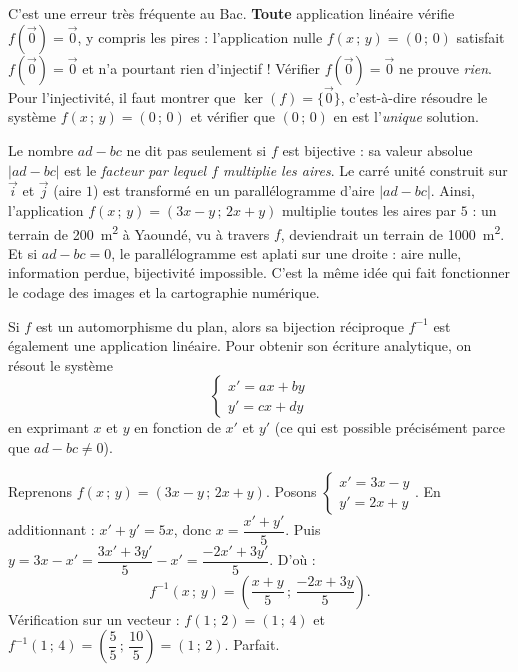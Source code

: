 \documentclass[11pt]{article}
\newcommand{\cle}[1]{{\popxbold\color{popdark}#1}}
\newcounter{popsec}
\newcounter{popsub}
\newcommand{\courssub}[1]{%
  \stepcounter{popsub}%
  \par\vspace{9pt}\noindent{\popxbold\fontsize{11.5}{13}\selectfont\color{popink}{\color{poporange}\thepopsec.\thepopsub}\hspace{6pt}#1}\par\nopagebreak\vspace{4pt}
}
\begin{document}
\begin{attention}[Le piège classique : « $f(\vec{0}) = \vec{0}$ donc $f$ est bijective »]
C'est une erreur très fréquente au Bac. \textbf{Toute} application linéaire vérifie $f(\vec{0}) = \vec{0}$, y compris les pires : l'application nulle $f(x\,;\,y) = (0\,;\,0)$ satisfait $f(\vec{0}) = \vec{0}$ et n'a pourtant rien d'injectif ! Vérifier $f(\vec{0}) = \vec{0}$ ne prouve \emph{rien}. Pour l'injectivité, il faut montrer que $\ker(f) = \{\vec{0}\}$, c'est-à-dire résoudre le système $f(x\,;\,y) = (0\,;\,0)$ et vérifier que $(0\,;\,0)$ en est l'\emph{unique} solution.
\end{attention}

\begin{savaistu}
Le nombre $ad - bc$ ne dit pas seulement si $f$ est bijective : sa valeur absolue $|ad - bc|$ est le \emph{facteur par lequel $f$ multiplie les aires}. Le carré unité construit sur $\vec{i}$ et $\vec{j}$ (aire $1$) est transformé en un parallélogramme d'aire $|ad - bc|$. Ainsi, l'application $f(x\,;\,y) = (3x - y\,;\,2x + y)$ multiplie toutes les aires par $5$ : un terrain de \SI{200}{m^2} à Yaoundé, vu à travers $f$, deviendrait un terrain de \SI{1000}{m^2}. Et si $ad - bc = 0$, le parallélogramme est aplati sur une droite : aire nulle, information perdue, bijectivité impossible. C'est la même idée qui fait fonctionner le codage des images et la cartographie numérique.
\end{savaistu}

\courssub{La réciproque d'un automorphisme}

\begin{propriete}
Si $f$ est un automorphisme du plan, alors sa bijection réciproque $f^{-1}$ est également une application \cle{linéaire}. Pour obtenir son écriture analytique, on résout le système
\[ \begin{cases} x' = ax + by \\ y' = cx + dy \end{cases} \]
en exprimant $x$ et $y$ en fonction de $x'$ et $y'$ (ce qui est possible précisément parce que $ad - bc \neq 0$).
\end{propriete}

\begin{exemplebox}
Reprenons $f(x\,;\,y) = (3x - y\,;\,2x + y)$. Posons $\begin{cases} x' = 3x - y \\ y' = 2x + y \end{cases}$. En additionnant : $x' + y' = 5x$, donc $x = \dfrac{x' + y'}{5}$. Puis $y = 3x - x' = \dfrac{3x' + 3y'}{5} - x' = \dfrac{-2x' + 3y'}{5}$. D'où :
\[ f^{-1}(x\,;\,y) = \left(\frac{x + y}{5}\,;\,\frac{-2x + 3y}{5}\right). \]
Vérification sur un vecteur : $f(1\,;\,2) = (1\,;\,4)$ et $f^{-1}(1\,;\,4) = \left(\dfrac{5}{5}\,;\,\dfrac{10}{5}\right) = (1\,;\,2)$. Parfait.
\end{exemplebox}
\end{document}
